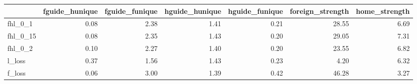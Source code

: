 \begin{tabular}{lrrrrrr}
\toprule
 & fguide_hunique & fguide_funique & hguide_hunique & hguide_funique & foreign_strength & home_strength \\
\midrule
fhl_0_1 & 0.08 & 2.38 & 1.41 & 0.21 & 28.55 & 6.69 \\
fhl_0_15 & 0.08 & 2.35 & 1.43 & 0.20 & 29.05 & 7.31 \\
fhl_0_2 & 0.10 & 2.27 & 1.40 & 0.20 & 23.55 & 6.82 \\
l_loss & 0.37 & 1.56 & 1.43 & 0.23 & 4.20 & 6.32 \\
f_loss & 0.06 & 3.00 & 1.39 & 0.42 & 46.28 & 3.27 \\
\bottomrule
\end{tabular}

